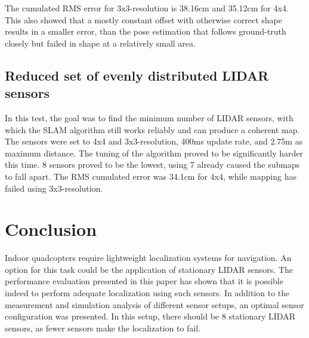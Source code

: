 \documentclass[conference]{IEEEtran}
\begin{document}
The cumulated RMS error for 3x3-resolution is 38.16cm and 35.12cm for 4x4. This also showed that a mostly
constant offset with otherwise correct shape results in a smaller error, than the pose estimation that 
follows ground-truth closely but failed in shape at a relatively small area. 

\subsection{Reduced set of evenly distributed LIDAR sensors}

In this test, the goal was to find the minimum number of LIDAR sensors, with which the SLAM algorithm still 
works reliably and can produce a coherent map. The sensors were set to 4x4 and 3x3-resolution, 400ms update 
rate, and 2.75m as maximum distance. The tuning of the algorithm proved to be significantly harder this time. 
8 sensors proved to be the lowest, using 7 already caused the submaps to fall apart. The RMS cumulated error 
was 34.1cm for 4x4, while mapping has failed using 3x3-resolution.  


\section{Conclusion}
Indoor quadcopters require lightweight localization systems for navigation. An option for this task could be the application of stationary LIDAR sensors. The performance evaluation presented in this paper has shown that it is possible indeed to perform adequate localization using such sensors. In addition to the measurement and simulation analysis of different sensor setups, an optimal sensor configuration was presented. In this setup, there should be 8 stationary LIDAR sensors, as fewer sensors make the localization to fail.





\end{document}
